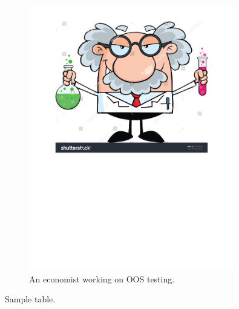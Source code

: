 \documentclass[12pt]{article}
\begin{document}
\setcounter{page}{20} %


\begin{figure}
  \centering
  \includegraphics[width=0.8\textwidth]{results/sample-image-1}
  \caption{An economist working on OOS testing.}
\end{figure}


\clearpage

\begin{table}
  \centering
  
  \caption{Sample table.}
\end{table}
\end{document}
